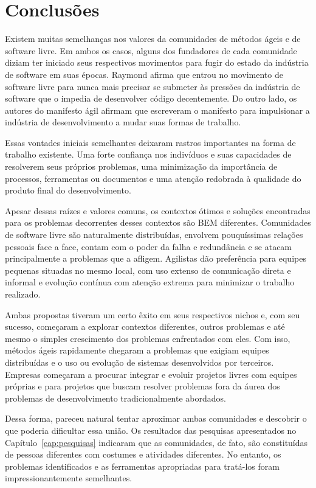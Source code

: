 \chapter{Conclusões}
\label{cap:conclusoes}

Existem muitas semelhanças nos valores da comunidades de métodos ágeis
e de software livre. Em ambos os casos, alguns dos fundadores de cada
comunidade diziam ter iniciado seus respectivos movimentos para fugir
do estado da indústria de software em suas épocas. Raymond afirma que
entrou no movimento de software livre para nunca mais precisar se
submeter às pressões da indústria de software que o impedia de
desenvolver código decentemente. Do outro lado, os autores do
manifesto ágil afirmam que escreveram o manifesto para impulsionar a
indústria de desenvolvimento a mudar suas formas de trabalho.

Essas vontades iniciais semelhantes deixaram rastros importantes na
forma de trabalho existente. Uma forte confiança nos indivíduos e suas
capacidades de resolverem seus próprios problemas, uma minimização da
importância de processos, ferramentas ou documentos e uma atenção
redobrada à qualidade do produto final do desenvolvimento.

Apesar dessas raízes e valores comuns, os contextos ótimos e soluções
encontradas para os problemas decorrentes desses contextos são BEM
diferentes. Comunidades de software livre são naturalmente
distribuídas, envolvem pouquíssimas relações pessoais face a face,
contam com o poder da falha e redundância e se atacam principalmente a
problemas que a afligem. Agilistas dão preferência para equipes
pequenas situadas no mesmo local, com uso extenso de comunicação
direta e informal e evolução contínua com atenção extrema para
minimizar o trabalho realizado.

Ambas propostas tiveram um certo êxito em seus respectivos nichos e,
com seu sucesso, começaram a explorar contextos diferentes, outros
problemas e até mesmo o simples crescimento dos problemas enfrentados
com eles. Com isso, métodos ágeis rapidamente chegaram a problemas que
exigiam equipes distribuídas e o uso ou evolução de sistemas
desenvolvidos por terceiros. Empresas começaram a procurar integrar e
evoluir projetos livres com equipes próprias e para projetos que
buscam resolver problemas fora da áurea dos problemas de
desenvolvimento tradicionalmente abordados.

Dessa forma, pareceu natural tentar aproximar ambas comunidades e
descobrir o que poderia dificultar essa união. Os resultados das
pesquisas apresentados no Capítulo~\ref{cap:pesquisas} indicaram que
as comunidades, de fato, são constituídas de pessoas diferentes com
costumes e atividades diferentes. No entanto, os problemas
identificados e as ferramentas apropriadas para tratá-los foram
impressionantemente semelhantes.

